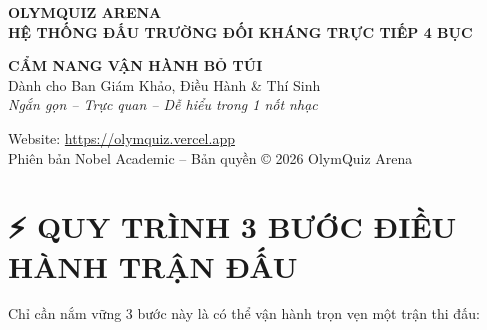 \documentclass[11pt,a4paper]{article}
\begin{document}
\begin{titlepage}
    \pagecolor{navybg}
    \color{white}
    \begin{center}
        \vspace*{1.5cm}
        
        
        \vspace{0.8cm}
        {\Huge\bfseries\color{goldprimary} OLYMQUIZ ARENA}\\[0.3cm]
        {\large\bfseries\color{slate!80} HỆ THỐNG ĐẤU TRƯỜNG ĐỐI KHÁNG TRỰC TIẾP 4 BỤC}\\[1.5cm]
        
        \begin{tcolorbox}[colback=cardbg,colframe=goldprimary!50,arc=4mm,width=0.85\textwidth,halign=center]
            \color{white}
            \vspace{0.2cm}
            {\Large\bfseries CẨM NANG VẬN HÀNH BỎ TÚI}\\[0.2cm]
            {\normalsize Dành cho Ban Giám Khảo, Điều Hành \& Thí Sinh}\\[0.2cm]
            \color{goldprimary}\small\textit{Ngắn gọn -- Trực quan -- Dễ hiểu trong 1 nốt nhạc}
            \vspace{0.2cm}
        \end{tcolorbox}
        
        \vfill
        
        {\small Website: \url{https://olymquiz.vercel.app}}\\[0.2cm]
        {\footnotesize Phiên bản Nobel Academic -- Bản quyền © 2026 OlymQuiz Arena}
        
        \vspace{1cm}
    \end{center}
\end{titlepage}

\nopagecolor
\color{black}

\section*{\color{navybg}⚡ QUY TRÌNH 3 BƯỚC ĐIỀU HÀNH TRẬN ĐẤU}
Chỉ cần nắm vững 3 bước này là có thể vận hành trọn vẹn một trận thi đấu:
\end{document}
